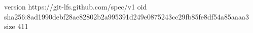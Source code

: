 version https://git-lfs.github.com/spec/v1
oid sha256:8ad1990debf28ae82802b2a995391d249e0875243cc29fb85fe8df54a85aaaa3
size 411
